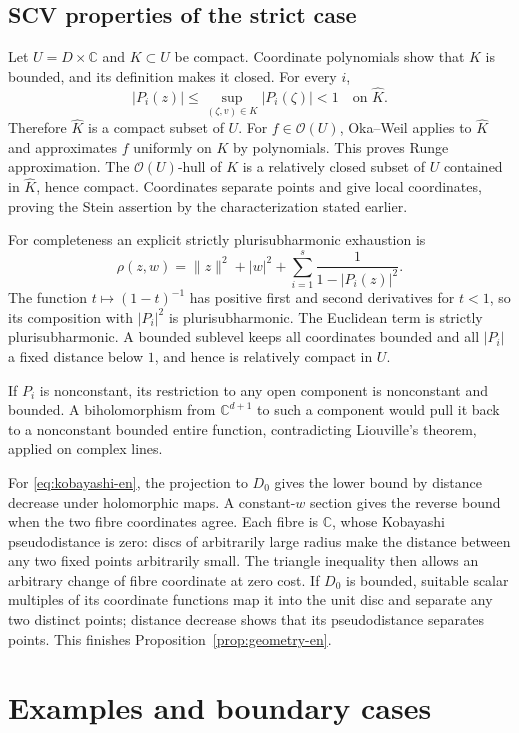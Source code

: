 \documentclass[12pt]{amsart}
\theoremstyle{definition}
\theoremstyle{remark}
\numberwithin{equation}{section}
\newcommand{\C}{\mathbb{C}}
\begin{document}
\subsection{SCV properties of the strict case}
Let $U=D\times\C$ and $K\subset U$ be compact. Coordinate polynomials show that $\widehat K$ is bounded, and its definition makes it closed. For every $i$,
\[
|P_i(z)|\leq\sup_{(\zeta,v)\in K}|P_i(\zeta)|<1
\quad\text{on }\widehat K.
\]
Therefore $\widehat K$ is a compact subset of $U$. For $f\in\mathcal O(U)$, Oka--Weil applies to $\widehat K$ and approximates $f$ uniformly on $K$ by polynomials. This proves Runge approximation. The $\mathcal O(U)$-hull of $K$ is a relatively closed subset of $U$ contained in $\widehat K$, hence compact. Coordinates separate points and give local coordinates, proving the Stein assertion by the characterization stated earlier.

For completeness an explicit strictly plurisubharmonic exhaustion is
\[
\rho(z,w)=\|z\|^2+|w|^2+
\sum_{i=1}^s\frac1{1-|P_i(z)|^2}.
\]
The function $t\mapsto(1-t)^{-1}$ has positive first and second derivatives for $t<1$, so its composition with $|P_i|^2$ is plurisubharmonic. The Euclidean term is strictly plurisubharmonic. A bounded sublevel keeps all coordinates bounded and all $|P_i|$ a fixed distance below $1$, and hence is relatively compact in $U$.

If $P_i$ is nonconstant, its restriction to any open component is nonconstant and bounded. A biholomorphism from $\C^{d+1}$ to such a component would pull it back to a nonconstant bounded entire function, contradicting Liouville's theorem, applied on complex lines.

For \eqref{eq:kobayashi-en}, the projection to $D_0$ gives the lower bound by distance decrease under holomorphic maps. A constant-$w$ section gives the reverse bound when the two fibre coordinates agree. Each fibre is $\C$, whose Kobayashi pseudodistance is zero: discs of arbitrarily large radius make the distance between any two fixed points arbitrarily small. The triangle inequality then allows an arbitrary change of fibre coordinate at zero cost. If $D_0$ is bounded, suitable scalar multiples of its coordinate functions map it into the unit disc and separate any two distinct points; distance decrease shows that its pseudodistance separates points. This finishes Proposition~\ref{prop:geometry-en}.

\section{Examples and boundary cases}
\end{document}
